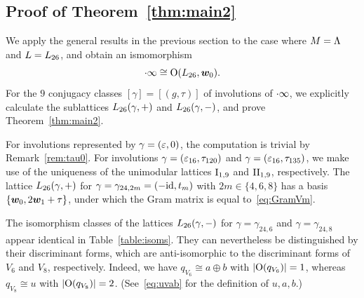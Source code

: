 \documentclass{amsart} %
\begin{document}
\subsection{Proof of Theorem~\ref{thm:main2}}\label{subsec:proofmain2}
%
We apply the general results in the previous section to the case where $M=\Lambda$ and $L=L_{26}$,
and obtain an ismomorphism 
\[
\cdot \infty\cong \mathord{\mathrm{O}}(L_{26}, \boldsymbol{w}_0).
\]
%
For the $9$ conjugacy classes 
$[\gamma]=[(g, \tau)]$ of involutions of $\cdot \infty$,
we explicitly calculate the sublattices $L_{26}(\gamma, +)$ and $L_{26}(\gamma, -)$, 
and prove Theorem~\ref{thm:main2}.
%
\begin{remark}
For involutions represented by $\gamma=(\varepsilon, 0)$,
the computation is trivial by Remark~\ref{rem:tau0}.
For involutions $\gamma=(\varepsilon_{16}, \tau_{120})$ and $\gamma=(\varepsilon_{16}, \tau_{135})$,
we make use of the uniqueness of the unimodular lattices $\mathrm{I}_{1, 9}$ and $\mathrm{II}_{1, 9}$,
respectively.
The lattice $L_{26}(\gamma,+)$ for $\gamma=\gamma_{24,2m}=(-\mathord{\mathrm{id}}, t_m)$
with $2m \in \{4,6,8\}$ has a basis $\{\boldsymbol{w}_0, 2\boldsymbol{w}_1+\tau\}$, 
under which the Gram matrix is equal to~\eqref{eq:GramVm}.
\end{remark}
%
%
%
%
%
\begin{remark}
The isomorphism classes of the lattices $L_{26}(\gamma,-)$ for $\gamma=\gamma_{24,6}$ 
and $\gamma=\gamma_{24,8}$ 
appear identical in Table~\ref{table:isoms}. 
They can nevertheless be distinguished by their discriminant forms, 
which are anti-isomorphic to the discriminant forms of $V_6$ and $V_8$, respectively. 
Indeed, we have $q_{V_6}\cong a\oplus b$ with $|\mathord{\mathrm{O}}(q_{V_6})|=1$, 
whereas $q_{V_8}\cong u$ with $|\mathord{\mathrm{O}}(q_{V_8})|=2$.
(See~\eqref{eq:uvab} for the definition of $u, a, b$.)
 \end{remark}
%
%
%
\end{document}
